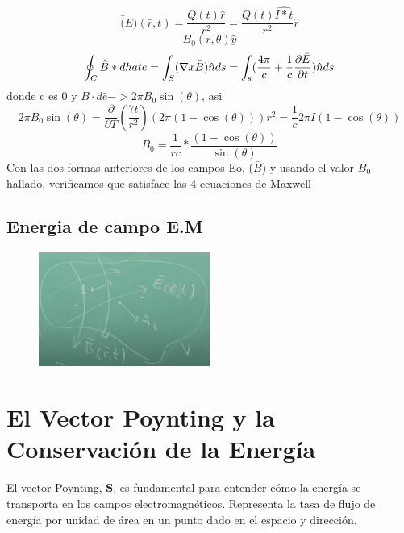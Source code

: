 \documentclass{article}
\begin{document}
	\begin{equation}
		\bar(E)(\bar{r},t)= \frac{Q(t)\hat{r}}{r^2}=\frac{Q(t)\hat{I*t}}{r^2}\hat{r}
	\end{equation}
	\begin{equation}
		B_{0}(r, \theta) \hat{y}
	\end{equation}
	\begin{equation}
		\oint_{C} \hat{B}*d\\hat{e} = \int_{S} (\nabla x \bar{B})\hat{n} ds=\int_{s} (\frac{4 \pi}{c} + \frac{1}{c} \frac{\partial\bar{E}}{\partial t}) \hat{n} ds
	\end{equation}
	donde c es 0 y \(B\cdot d\hat{e} -> 2 \pi B_{0} \sin(\theta)\), asi
	\begin{equation}
		2 \pi B_{0} \sin(\theta)= \frac{\partial}{\partial T}(\frac{7t}{r^2})(2\pi (1-\cos(\theta)))r^2 = \frac{1}{c}2\pi I(1-\cos(\theta))
	\end{equation}
	\begin{equation}
		B_{0}=\frac{1}{rc} * \frac{(1-\cos(\theta))}{\sin(\theta)}
	\end{equation}
	Con las dos formas anteriores de los campos Eo, (\(\bar{B}\)) y usando el valor \(B_{0}\) hallado, verificamos que satisface las 4 ecuaciones de Maxwell
	\subsection{Energia de campo E.M}
	\begin{figure}[h]
		\centering
		\includegraphics[width=0.5\textwidth]{imagen1.jpg}
		\label{fig:mi_imagen2}
	\end{figure}
	\section{El Vector Poynting y la Conservación de la Energía}
	El vector Poynting, \(\mathbf{S}\), es fundamental para entender cómo la energía se transporta en los campos electromagnéticos. Representa la tasa de flujo de energía por unidad de área en un punto dado en el espacio y dirección.
	
\end{document}
